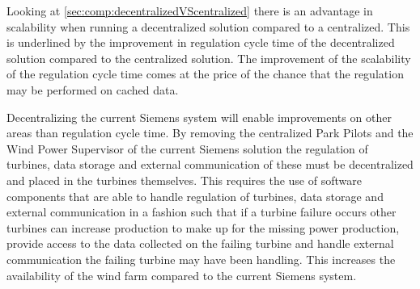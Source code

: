 Looking at \cref{sec:comp:decentralizedVScentralized} there is an advantage in scalability when running a decentralized solution compared to a centralized. This is underlined by the improvement in regulation cycle time of the decentralized solution compared to the centralized solution. The improvement of the scalability of the regulation cycle time comes at the price of the chance that the regulation may be performed on cached data.

Decentralizing the current Siemens system will enable improvements on other areas than regulation cycle time. By removing the centralized Park Pilots and the Wind Power Supervisor of the current Siemens solution the regulation of turbines, data storage and external communication of these must be decentralized and placed in the turbines themselves. This requires the use of software components that are able to handle regulation of turbines, data storage and external communication in a fashion such that if a turbine failure occurs other turbines can increase production to make up for the missing power production, provide access to the data collected on the failing turbine and handle external communication the failing turbine may have been handling. This increases the availability of the wind farm compared to the current Siemens system.


